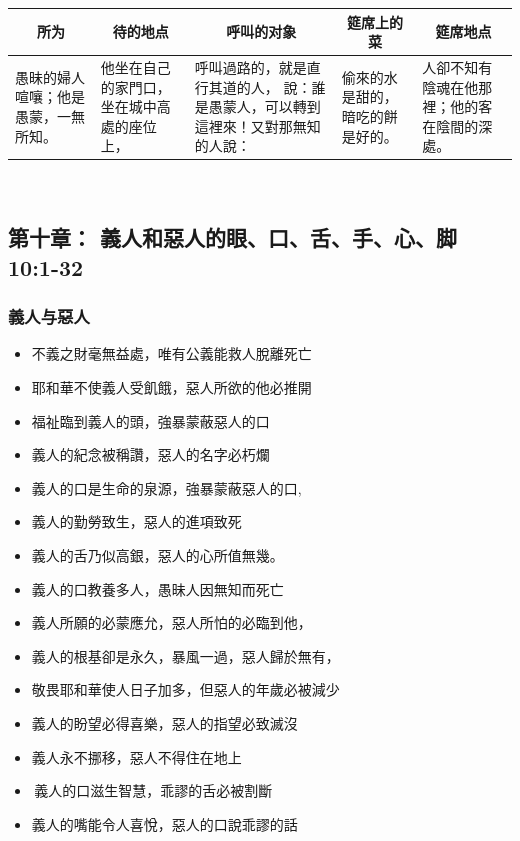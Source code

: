\begin{table}[H]
\centering
\begin{tabular}{p{2.75cm}|p{3.00cm}|p{5.00cm}|p{2.00cm}|p{3.00cm}}\hline\hline
\multicolumn{1}{c|}{所为}&\multicolumn{1}{c|}{待的地点}&\multicolumn{1}{c|}{呼叫的对象}&\multicolumn{1}{c|}{筵席上的菜}&\multicolumn{1}{c}{筵席地点}\\\hline
愚昧的婦人喧嚷；他是愚蒙，一無所知。
&他坐在自己的家門口，坐在城中高處的座位上，
&呼叫過路的，就是直行其道的人，
說：誰是愚蒙人，可以轉到這裡來！又對那無知的人說：
&偷來的水是甜的，暗吃的餅是好的。
&人卻不知有陰魂在他那裡；他的客在陰間的深處。\\\hline
\end{tabular}
\end{table} 



\subsection{第十章： 義人和惡人的眼、口、舌、手、心、脚  10:1-32}
\subsubsection{義人与惡人}
\begin{itemize}
\itemsep-.45em  
\item 不義之財毫無益處，唯有公義能救人脫離死亡
\item 耶和華不使義人受飢餓，惡人所欲的他必推開
\item 福祉臨到義人的頭，強暴蒙蔽惡人的口 
\item 義人的紀念被稱讚，惡人的名字必朽爛 
\item 義人的口是生命的泉源，強暴蒙蔽惡人的口,
\item 義人的勤勞致生，惡人的進項致死
\item 義人的舌乃似高銀，惡人的心所值無幾。
\item 義人的口教養多人，愚昧人因無知而死亡
\item 義人所願的必蒙應允，惡人所怕的必臨到他，
\item 義人的根基卻是永久，暴風一過，惡人歸於無有，
\item 敬畏耶和華使人日子加多，但惡人的年歲必被減少
\item 義人的盼望必得喜樂，惡人的指望必致滅沒
\item 義人永不挪移，惡人不得住在地上 
\item 義人的口滋生智慧，乖謬的舌必被割斷
\item 義人的嘴能令人喜悅，惡人的口說乖謬的話
\end{itemize}
